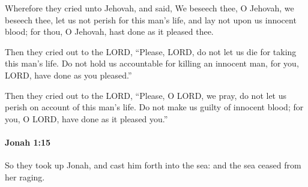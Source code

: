 			\begin{versebox}
					\item[BHS] 
					\item[LXX] 
					\item[ASV] Wherefore they cried unto Jehovah, and said, We beseech thee, O Jehovah, we beseech thee, let us not perish for this man's life, and lay not upon us innocent blood; for thou, O Jehovah, hast done as it pleased thee.
					\item[NIV] Then they cried out to the LORD, “Please, LORD, do not let us die for taking this man’s life. Do not hold us accountable for killing an innocent man, for you, LORD, have done as you pleased.”
					\item[NRSV] Then they cried out to the LORD, “Please, O LORD, we pray, do not let us perish on account of this man’s life. Do not make us guilty of innocent blood; for you, O LORD, have done as it pleased you.”
			\end{versebox}

		\paragraph{Jonah 1:15} %
			\label{JONAH-1-15}

			So they took up Jonah, and cast him forth into the sea: and the sea ceased from her raging.

